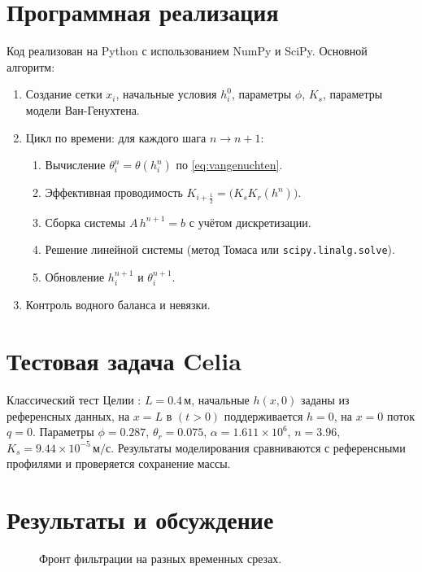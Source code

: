 \documentclass[a4paper,12pt]{article}
\begin{document}
\section{Программная реализация}
Код реализован на Python с использованием NumPy и SciPy. Основной алгоритм:
\begin{enumerate}
  \item Создание сетки $x_i$, начальные условия $h_i^0$, параметры $\phi$, $K_s$, параметры модели Ван-Генухтена.
  \item Цикл по времени: для каждого шага $n\to n+1$:
    \begin{enumerate}
      \item Вычисление $\theta_i^n=\theta(h_i^n)$ по \eqref{eq:vangenuchten}.
      \item Эффективная проводимость $K_{i+\frac12} = \bigl(K_sK_r(h^n)\bigr)$.
      \item Сборка системы $A\,h^{n+1}=b$ с учётом дискретизации.
      \item Решение линейной системы (метод Томаса или \texttt{scipy.linalg.solve}).
      \item Обновление $h_i^{n+1}$ и $\theta_i^{n+1}$.
    \end{enumerate}
  \item Контроль водного баланса и невязки.
\end{enumerate}

\section{Тестовая задача Celia}
Классический тест Целии \cite{Celia1990}: $L=0.4$\,м, начальные $h(x,0)$ заданы из референсных данных, на $x=L$ в $(t>0)$ поддерживается $h=0$, на $x=0$ поток $q=0$. Параметры $\phi=0.287$, $\theta_r=0.075$, $\alpha=1.611\times10^{6}$, $n=3.96$, $K_s=9.44\times10^{-5}\,\mathrm{м/с}$. Результаты моделирования сравниваются с референсными профилями и проверяется сохранение массы.

\section{Результаты и обсуждение}
\begin{figure}[ht]
  \centering
  \caption{Фронт фильтрации на разных временных срезах.}
  \label{fig:front}
\end{figure}
\end{document}
